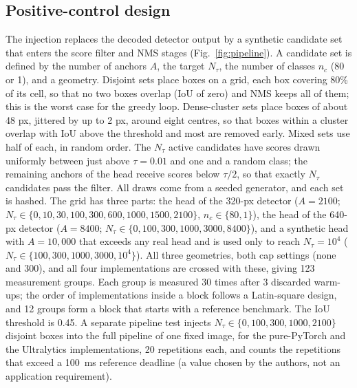 \documentclass[a4paper,fleqn]{cas-dc}
\newcommand{\Ntau}{N_{\tau}}
\begin{document}
\subsection{Positive-control design}
The injection replaces the decoded detector output by a synthetic candidate set that enters the score filter and NMS stages (Fig.~\ref{fig:pipeline}). A candidate set is defined by the number of anchors $A$, the target $\Ntau$, the number of classes $n_c$ (80 or 1), and a geometry. Disjoint sets place boxes on a grid, each box covering 80\% of its cell, so that no two boxes overlap (IoU of zero) and NMS keeps all of them; this is the worst case for the greedy loop. Dense-cluster sets place boxes of about 48 px, jittered by up to 2 px, around eight centres, so that boxes within a cluster overlap with IoU above the threshold and most are removed early. Mixed sets use half of each, in random order. The $\Ntau$ active candidates have scores drawn uniformly between just above $\tau=0.01$ and one and a random class; the remaining anchors of the head receive scores below $\tau/2$, so that exactly $\Ntau$ candidates pass the filter. All draws come from a seeded generator, and each set is hashed. The grid has three parts: the head of the 320-px detector ($A=2100$; $\Ntau\in\{0,10,30,100,300,600,1000,1500,2100\}$, $n_c\in\{80,1\}$), the head of the 640-px detector ($A=8400$; $\Ntau\in\{0,100,300,1000,3000,8400\}$), and a synthetic head with $A=10{,}000$ that exceeds any real head and is used only to reach $\Ntau=10^4$ ($\Ntau\in\{100,300,1000,3000,10^4\}$). All three geometries, both cap settings (none and 300), and all four implementations are crossed with these, giving 123 measurement groups. Each group is measured 30 times after 3 discarded warm-ups; the order of implementations inside a block follows a Latin-square design, and 12 groups form a block that starts with a reference benchmark. The IoU threshold is 0.45. A separate pipeline test injects $\Ntau\in\{0,100,300,1000,2100\}$ disjoint boxes into the full pipeline of one fixed image, for the pure-PyTorch and the Ultralytics implementations, 20 repetitions each, and counts the repetitions that exceed a 100~ms reference deadline (a value chosen by the authors, not an application requirement).
\end{document}
